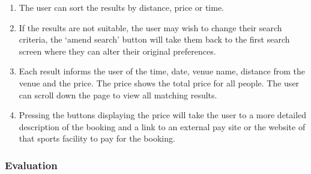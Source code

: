 \begin{enumerate}
	\item The user can sort the results by distance, price or time.
	\item If the results are not suitable, the user may wish to change their
		search criteria, the `amend search' button will take them back to the
		first search screen where they can alter their original preferences.
	\item Each result informs the user of the time, date, venue name, distance
		from the venue and the price. The price shows the total price for all
		people. The user can scroll down the page to view all matching results.
	\item Pressing the buttons displaying the price will take the user to a
		more detailed description of the booking and a link to an external pay
		site or the website of that sports facility to pay for the booking.
\end{enumerate}

\fullwidth%
\subsubsection{Evaluation}

